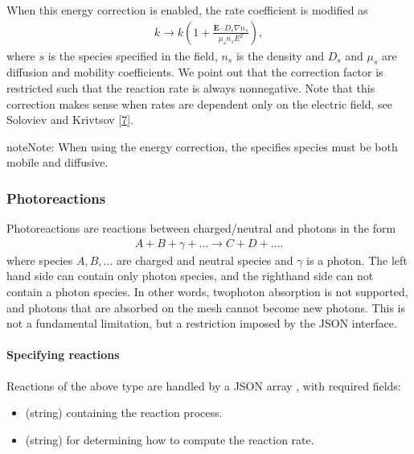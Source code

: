 \documentclass[letterpaper,10pt,english]{sphinxmanual}
\begin{document}
\sphinxAtStartPar
When this energy correction is enabled, the rate coefficient is modified as
\begin{equation*}
\begin{split}k \rightarrow k\left(1 + \frac{\mathbf{E}\cdot D_s\nabla n_s}{\mu_s n_s E^2}\right),\end{split}
\end{equation*}
\sphinxAtStartPar
where \(s\) is the species specified in the  field, \(n_s\) is the density and \(D_s\) and \(\mu_s\) are diffusion and mobility coefficients.
We point out that the correction factor is restricted such that the reaction rate is always non\sphinxhyphen{}negative.
Note that this correction makes sense when rates are dependent only on the electric field, see Soloviev and Krivtsov {[}\hyperlink{cite.ZZReferences:id101}{7}{]}.

\begin{sphinxadmonition}{note}{Note:}
\sphinxAtStartPar
When using the energy correction, the specifies species must be both mobile and diffusive.
\end{sphinxadmonition}


\subsubsection{Photo\sphinxhyphen{}reactions}
\label{\detokenize{Applications/CdrPlasmaModel:photo-reactions}}\label{\detokenize{Applications/CdrPlasmaModel:chap-photoreactionsjson}}
\sphinxAtStartPar
Photo\sphinxhyphen{}reactions are reactions between charged/neutral and photons in the form
\begin{equation*}
\begin{split}A + B + \gamma + \ldots \rightarrow C + D + \ldots.\end{split}
\end{equation*}
\sphinxAtStartPar
where species \(A, B, \ldots\) are charged and neutral species and \(\gamma\) is a photon.
The left hand side can contain only  photon species, and the right\sphinxhyphen{}hand side can not contain a photon species.
In other words, two\sphinxhyphen{}photon absorption is not supported, and photons that are absorbed on the mesh cannot become new photons.
This is not a fundamental limitation, but a restriction imposed by the JSON interface.


\paragraph{Specifying reactions}
\label{\detokenize{Applications/CdrPlasmaModel:id7}}
\sphinxAtStartPar
Reactions of the above type are handled by a JSON array , with required fields:
\begin{itemize}
\item {} 
\sphinxAtStartPar
{} (string) containing the reaction process.

\item {} 
\sphinxAtStartPar
{} (string) for determining how to compute the reaction rate.

\end{itemize}
\end{document}
